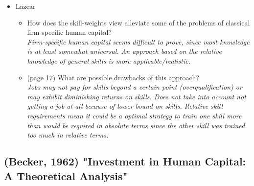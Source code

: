 \documentclass[12pt,a4paper]{article}
\begin{document}
\begin{itemize}
	\item Lazear
	  \begin{itemize}
	    \item How does the skill-weights view alleviate some of the problems of classical firm-specific human capital? \\
	      \emph{Firm-specific human capital seems difficult to prove, since most knowledge is at least somewhat universal. An approach based on the relative knowledge of general skills is more applicable/realistic.}
	    \item (page 17) What are possible drawbacks of this approach? \\
	      \emph{Jobs may not pay for skills beyond a certain point (overqualification) or may exhibit diminishing returns on skills. Does not take into account not getting a job at all because of lower bound on skills. Relative skill requirements mean it could be a optimal strategy to train one skill more than would be required in absolute terms since the other skill was trained too much in relative terms.}

	  \end{itemize}
	

  \end{itemize}
  \subsection{(Becker, 1962) "Investment in Human Capital: A Theoretical Analysis"} %
  \label{prt:Becker}

\end{document}
